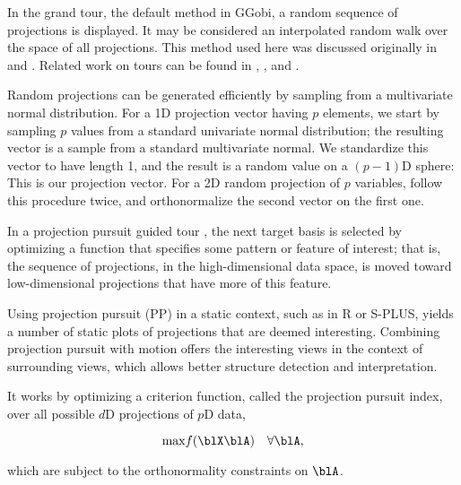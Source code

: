 \bigskip
{} In the grand tour,  
the default method in GGobi, a random sequence of projections is
displayed.  It may be considered an interpolated random walk over the
space of all projections. This method used here was discussed
originally in  and . Related work
on tours can be found in , , and
.

Random projections can be generated efficiently by sampling from a
multivariate normal distribution. For a 1D projection vector having
$p$ elements, we start by sampling $p$ values from a standard
univariate normal distribution; the resulting vector is a sample from
a standard multivariate normal.  We standardize this vector to have
length 1, and the result is a random value on a $(p-1)$D sphere: This
is our projection vector.  For a 2D random projection of $p$
variables, follow this procedure twice, and orthonormalize the second
vector on the first one.

\bigskip
{}
 In a projection pursuit guided tour 
\cite{CBCH95}, the next target basis is selected by optimizing a
function that specifies some pattern or feature of interest; that is,
the sequence of projections, in the high-dimensional data space, is
moved toward low-dimensional projections that have more of this
feature.

 Using projection pursuit (PP) in a static
context, such as in R or S-PLUS, yields a number of static plots of
projections that are deemed interesting.  Combining projection pursuit
with motion offers the interesting views in the context of surrounding
views, which allows better structure detection and interpretation.

It works by optimizing a criterion function, called the projection
pursuit index, over all possible $d$D projections of $p$D data,

\[
\mbox{max} f(\blX\blA) ~~~\forall \blA,
\]

\noindent which are subject to the orthonormality constraints on $\blA$.


